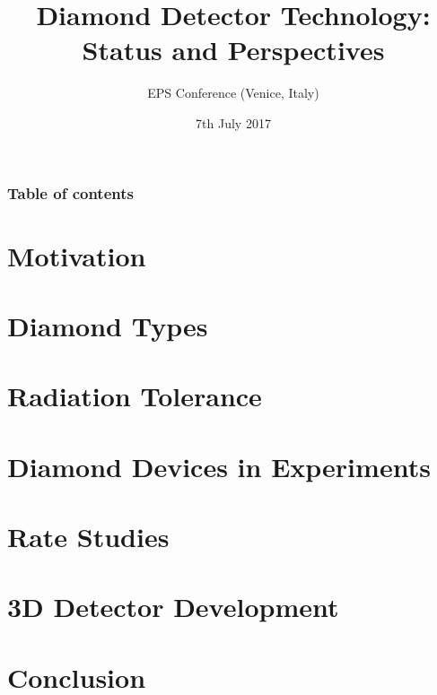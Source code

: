 \documentclass[9pt, xcolor=dvipsnames]{beamer}
\title[Diamond Detectors]{Diamond Detector Technology: Status and Perspectives}
\subtitle{EPS Conference (Venice, Italy)}
\date{7th July 2017}
\begin{document}


\begin{frame}%
	\frametitle{Table of contents}
	\tableofcontents[hideallsubsections]   %
\end{frame}

% 

\section{Motivation}


\section{Diamond Types}


\section{Radiation Tolerance}


\section{Diamond Devices in Experiments}


\section{Rate Studies}


\section{3D Detector Development}



\section{Conclusion}


\end{document}

